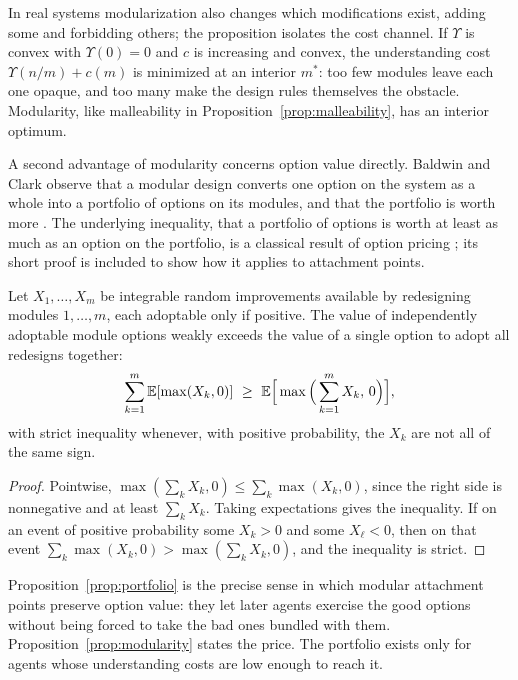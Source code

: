 In real systems modularization also changes which modifications exist, adding some and forbidding others; the proposition isolates the cost channel. If $\Upsilon$ is convex with $\Upsilon(0)=0$ and $c$ is increasing and convex, the understanding cost $\Upsilon(n/m)+c(m)$ is minimized at an interior $m^\ast$: too few modules leave each one opaque, and too many make the design rules themselves the obstacle. Modularity, like malleability in Proposition~\ref{prop:malleability}, has an interior optimum.

A second advantage of modularity concerns option value directly. Baldwin and Clark observe that a modular design converts one option on the system as a whole into a portfolio of options on its modules, and that the portfolio is worth more \cite{baldwinclark2000}. The underlying inequality, that a portfolio of options is worth at least as much as an option on the portfolio, is a classical result of option pricing \cite{merton1973}; its short proof is included to show how it applies to attachment points.

\begin{proposition}\label{prop:portfolio}
Let $X_1,\dots,X_m$ be integrable random improvements available by redesigning modules $1,\dots,m$, each adoptable only if positive. The value of independently adoptable module options weakly exceeds the value of a single option to adopt all redesigns together:
\[
\sum_{k=1}^m\E[\max(X_k,0)]\ \geq\ \E\Big[\max\Big(\sum_{k=1}^mX_k,\,0\Big)\Big],
\]
with strict inequality whenever, with positive probability, the $X_k$ are not all of the same sign.
\end{proposition}

\begin{proof}
Pointwise, $\max(\sum_kX_k,0)\leq\sum_k\max(X_k,0)$, since the right side is nonnegative and at least $\sum_kX_k$. Taking expectations gives the inequality. If on an event of positive probability some $X_k>0$ and some $X_\ell<0$, then on that event $\sum_k\max(X_k,0)>\max(\sum_kX_k,0)$, and the inequality is strict.
\end{proof}

Proposition~\ref{prop:portfolio} is the precise sense in which modular attachment points preserve option value: they let later agents exercise the good options without being forced to take the bad ones bundled with them. Proposition~\ref{prop:modularity} states the price. The portfolio exists only for agents whose understanding costs are low enough to reach it.

